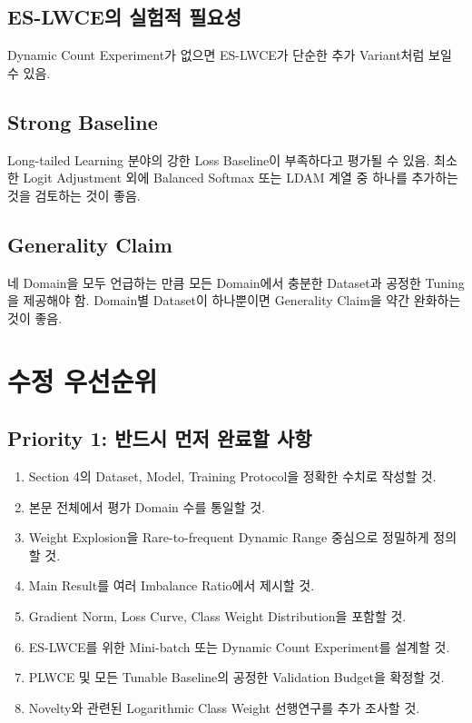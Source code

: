 \documentclass[11pt,a4paper]{article}
\begin{document}
\subsection{ES-LWCE의 실험적 필요성}

Dynamic Count Experiment가 없으면 ES-LWCE가 단순한 추가 Variant처럼 보일 수 있음.

\subsection{Strong Baseline}

Long-tailed Learning 분야의 강한 Loss Baseline이 부족하다고 평가될 수 있음. 최소한 Logit Adjustment 외에 Balanced Softmax 또는 LDAM 계열 중 하나를 추가하는 것을 검토하는 것이 좋음.

\subsection{Generality Claim}

네 Domain을 모두 언급하는 만큼 모든 Domain에서 충분한 Dataset과 공정한 Tuning을 제공해야 함. Domain별 Dataset이 하나뿐이면 Generality Claim을 약간 완화하는 것이 좋음.

\section{수정 우선순위}

\subsection{Priority 1: 반드시 먼저 완료할 사항}

\begin{enumerate}
\item Section 4의 Dataset, Model, Training Protocol을 정확한 수치로 작성할 것.
\item 본문 전체에서 평가 Domain 수를 통일할 것.
\item Weight Explosion을 Rare-to-frequent Dynamic Range 중심으로 정밀하게 정의할 것.
\item Main Result를 여러 Imbalance Ratio에서 제시할 것.
\item Gradient Norm, Loss Curve, Class Weight Distribution을 포함할 것.
\item ES-LWCE를 위한 Mini-batch 또는 Dynamic Count Experiment를 설계할 것.
\item PLWCE 및 모든 Tunable Baseline의 공정한 Validation Budget을 확정할 것.
\item Novelty와 관련된 Logarithmic Class Weight 선행연구를 추가 조사할 것.
\end{enumerate}
\end{document}
